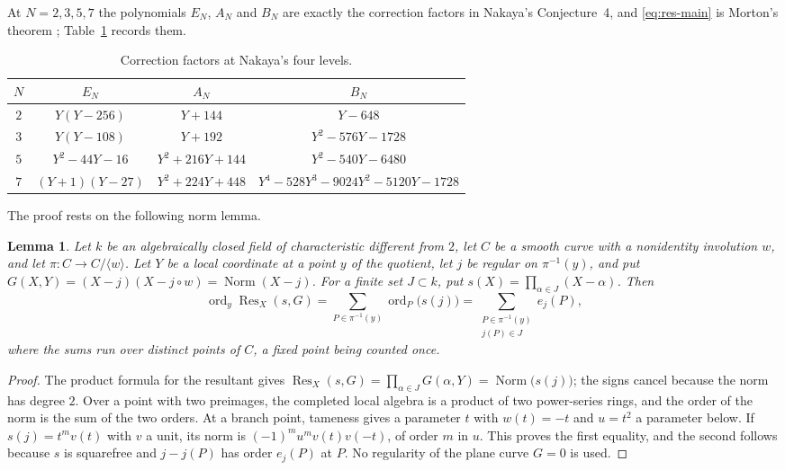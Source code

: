 \documentclass[11pt,a4paper]{article}
\newtheorem{lemma}[theorem]{Lemma}
\theoremstyle{remark}\newtheorem{remark}[theorem]{Remark}
\numberwithin{equation}{section}
\begin{document}
	At $N=2,3,5,7$ the polynomials $E_N$, $A_N$ and $B_N$ are exactly the correction factors in Nakaya's Conjecture~4, and \eqref{eq:res-main} is Morton's theorem \cite[Theorems~1, 3 and~5]{MortonFricke}; Table~\ref{tab:res-small} records them.
	
	\begin{table}[ht]\centering
		\begin{tabular}{cccc}\toprule
			$N$ & $E_N$ & $A_N$ & $B_N$\\\midrule
			$2$ & $Y(Y-256)$ & $Y+144$ & $Y-648$\\
			$3$ & $Y(Y-108)$ & $Y+192$ & $Y^2-576Y-1728$\\
			$5$ & $Y^2-44Y-16$ & $Y^2+216Y+144$ & $Y^2-540Y-6480$\\
			$7$ & $(Y+1)(Y-27)$ & $Y^2+224Y+448$ & $Y^4-528Y^3-9024Y^2-5120Y-1728$\\\bottomrule
		\end{tabular}
		\caption{Correction factors at Nakaya's four levels.}\label{tab:res-small}
	\end{table}
	
	The proof rests on the following norm lemma.
	
	\begin{lemma}\label{lem:norm}
		Let $k$ be an algebraically closed field of characteristic different from $2$, let $C$ be a smooth curve with a nonidentity involution $w$, and let $\pi\colon C\to C/\langle w\rangle$. Let $Y$ be a local coordinate at a point $y$ of the quotient, let $j$ be regular on $\pi^{-1}(y)$, and put $G(X,Y)=(X-j)(X-j\circ w)=\operatorname{Norm}(X-j)$. For a finite set $J\subset k$, put $s(X)=\prod_{\alpha\in J}(X-\alpha)$. Then
		\[
		\operatorname{ord}_{y}\operatorname{Res}_X(s,G)=\sum_{P\in\pi^{-1}(y)}\operatorname{ord}_P\bigl(s(j)\bigr)=\sum_{\substack{P\in\pi^{-1}(y)\\ j(P)\in J}}e_j(P),
		\]
		where the sums run over distinct points of $C$, a fixed point being counted once.
	\end{lemma}
	\begin{proof}
		The product formula for the resultant gives $\operatorname{Res}_X(s,G)=\prod_{\alpha\in J}G(\alpha,Y)=\operatorname{Norm}\bigl(s(j)\bigr)$; the signs cancel because the norm has degree $2$. Over a point with two preimages, the completed local algebra is a product of two power-series rings, and the order of the norm is the sum of the two orders. At a branch point, tameness gives a parameter $t$ with $w(t)=-t$ and $u=t^2$ a parameter below. If $s(j)=t^mv(t)$ with $v$ a unit, its norm is $(-1)^mu^mv(t)v(-t)$, of order $m$ in $u$. This proves the first equality, and the second follows because $s$ is squarefree and $j-j(P)$ has order $e_j(P)$ at $P$. No regularity of the plane curve $G=0$ is used.
	\end{proof}
	
\end{document}
